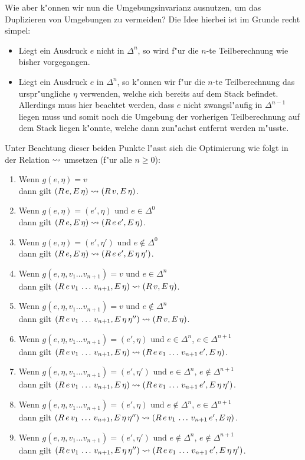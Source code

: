 \documentclass[12pt,a4paper]{article}
\begin{document}
Wie aber k"onnen wir nun die Umgebungsinvarianz ausnutzen, um das Duplizieren von Umgebungen zu vermeiden?
Die Idee hierbei ist im Grunde recht simpel:
\begin{itemize}
\item Liegt ein Ausdruck $e$ nicht in $\Delta^n$, so wird f"ur die $n$-te Teilberechnung wie bisher
  vorgegangen.
\item Liegt ein Ausdruck $e$ in $\Delta^n$, so k"onnen wir f"ur die $n$-te Teilberechnung das urspr"ungliche
  $\eta$ verwenden, welche sich bereits auf dem Stack befindet. Allerdings muss hier beachtet werden, dass
  $e$ nicht zwangsl"aufig in $\Delta^{n-1}$ liegen muss und somit noch die Umgebung der vorherigen
  Teilberechnung auf dem Stack liegen k"onnte, welche dann zun"achst entfernt werden m"usste.
\end{itemize}
Unter Beachtung dieser beiden Punkte l"asst sich die Optimierung wie folgt in der Relation $\rightsquigarrow$ umsetzen
(f"ur alle $n \ge 0$):
\begin{enumerate}
\item Wenn $g(e,\eta) = v$ \\
  dann gilt $(R\,e,E\,\eta) \rightsquigarrow (R\,v,E\,\eta)$.
\item Wenn $g(e,\eta) = (e',\eta)$ und $e\in\Delta^0$ \\
  dann gilt $(R\,e,E\,\eta) \rightsquigarrow (R\,e\,e',E\,\eta)$.
\item Wenn $g(e,\eta) = (e',\eta')$ und $e\not\in\Delta^0$ \\
  dann gilt $(R\,e,E\,\eta) \rightsquigarrow (R\,e\,e',E\,\eta\,\eta')$.
\item Wenn $g(e,\eta,v_1 \ldots v_{n+1}) = v$ und $e\in\Delta^n$ \\
  dann gilt $(R\,e\,v_1\,\ldots\,v_{n+1},E\,\eta) \rightsquigarrow (R\,v,E\,\eta)$.
\item Wenn $g(e,\eta,v_1 \ldots v_{n+1}) = v$ und $e\not\in\Delta^n$ \\
  dann gilt $(R\,e\,v_1\,\ldots\,v_{n+1},E\,\eta\,\eta'') \rightsquigarrow (R\,v,E\,\eta)$.
\item Wenn $g(e,\eta,v_1 \ldots v_{n+1}) = (e',\eta)$ und $e\in\Delta^n$, $e\in\Delta^{n+1}$ \\
  dann gilt $(R\,e\,v_1\,\ldots\,v_{n+1},E\,\eta) \rightsquigarrow (R\,e\,v_1\,\ldots\,v_{n+1}\,e',E\,\eta)$.
\item Wenn $g(e,\eta,v_1 \ldots v_{n+1}) = (e',\eta')$ und $e\in\Delta^n$, $e\not\in\Delta^{n+1}$ \\
  dann gilt $(R\,e\,v_1\,\ldots\,v_{n+1},E\,\eta) \rightsquigarrow (R\,e\,v_1\,\ldots\,v_{n+1}\,e',E\,\eta\,\eta')$.
\item Wenn $g(e,\eta,v_1 \ldots v_{n+1}) = (e',\eta)$ und $e\not\in\Delta^n$, $e\in\Delta^{n+1}$ \\
  dann gilt $(R\,e\,v_1\,\ldots\,v_{n+1},E\,\eta\,\eta'') \rightsquigarrow (R\,e\,v_1\,\ldots\,v_{n+1}\,e',E\,\eta)$.
\item Wenn $g(e,\eta,v_1 \ldots v_{n+1}) = (e',\eta')$ und $e\not\in\Delta^n$, $e\not\in\Delta^{n+1}$ \\
  dann gilt $(R\,e\,v_1\,\ldots\,v_{n+1},E\,\eta\,\eta'') \rightsquigarrow (R\,e\,v_1\,\ldots\,v_{n+1}\,e',E\,\eta\,\eta')$.
\end{enumerate}
\end{document}
